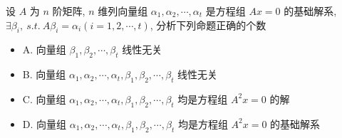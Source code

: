 \begin{example}[][Exam: 34.1.10]
	设 $A$ 为 $n$ 阶矩阵, $n$ 维列向量组 $\alpha_{1},\alpha_{2},\cdots,\alpha_{t}$ 是方程组 $Ax=0$ 的基础解系,
	$\exists \beta_{i},\ s.t.\ A\beta_{i}=\alpha_{i}(i=1,2,\cdots,t)$, 分析下列命题正确的个数
	\begin{itemize}
		\item A. 向量组 $\beta_{1},\beta_{2},\cdots,\beta_{t}$ 线性无关
		\item B. 向量组 $\alpha_{1},\alpha_{2},\cdots,\alpha_{t},\beta_{1},\beta_{2},\cdots,\beta_{t}$ 线性无关
		\item C. 向量组 $\alpha_{1},\alpha_{2},\cdots,\alpha_{t},\beta_{1},\beta_{2},\cdots,\beta_{t}$ 均是方程组 $A^2x=0$ 的解
		\item D. 向量组 $\alpha_{1},\alpha_{2},\cdots,\alpha_{t},\beta_{1},\beta_{2},\cdots,\beta_{t}$ 均是方程组 $A^2x=0$ 的基础解系
	\end{itemize}
\end{example}
